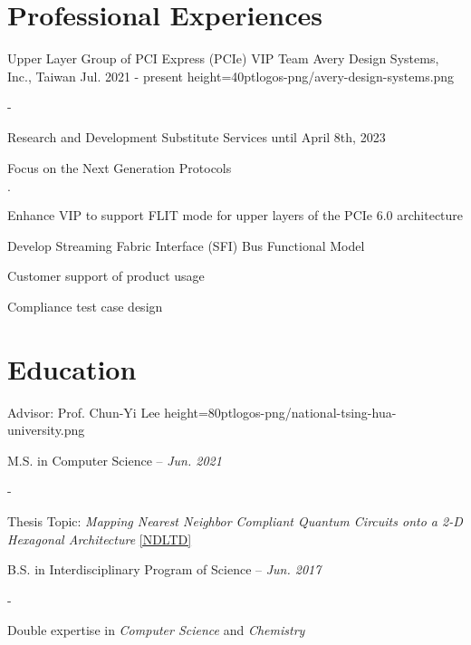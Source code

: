\documentclass{cvclass}
\begin{document}
\makeinfo


\section{Professional Experiences}

    {Upper Layer Group of PCI Express (PCIe) VIP Team}
    {Avery Design Systems, Inc., Taiwan}
    {Jul. 2021 - present}
    {height=40pt}{logos-png/avery-design-systems.png}
\begin{plainitemize}{-}
    \item Research and Development Substitute Services until April 8th, 2023
    \item Focus on the Next Generation Protocols
    \begin{plainitemize}{\(\cdot\)}
        \item Enhance VIP to support FLIT mode for upper layers of the PCIe 6.0 architecture
        \item Develop Streaming Fabric Interface (SFI) Bus Functional Model
    \end{plainitemize}
    \item Customer support of product usage
    \item Compliance test case design
\end{plainitemize}


\section{Education}

        {Advisor: Prof. Chun-Yi Lee}
        {height=80pt}{logos-png/national-tsing-hua-university.png}{
    \item M.S. in Computer Science -- \textit{Jun. 2021}
    \begin{plainitemize}{-}
        \item Thesis Topic: \textit{Mapping Nearest Neighbor Compliant Quantum Circuits onto a 2-D Hexagonal Architecture} \href{https://hdl.handle.net/11296/dpttkc}{[NDLTD]}
    \end{plainitemize}
    \item B.S. in Interdisciplinary Program of Science -- \textit{Jun. 2017}
    \begin{plainitemize}{-}
        \item Double expertise in \textit{Computer Science} and \textit{Chemistry}
    \end{plainitemize}}
\end{document}
